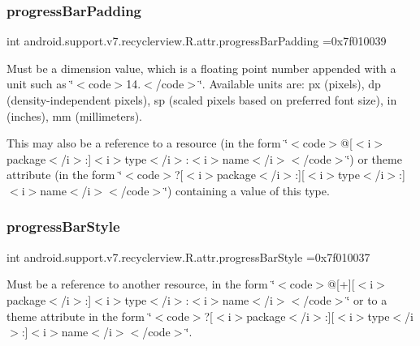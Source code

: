 \subsubsection{\texorpdfstring{progress\+Bar\+Padding}{progressBarPadding}}
{\footnotesize\ttfamily int android.\+support.\+v7.\+recyclerview.\+R.\+attr.\+progress\+Bar\+Padding =0x7f010039\hspace{0.3cm}{\ttfamily [static]}}

Must be a dimension value, which is a floating point number appended with a unit such as \char`\"{}$<$code$>$14.\+5sp$<$/code$>$\char`\"{}. Available units are\+: px (pixels), dp (density-\/independent pixels), sp (scaled pixels based on preferred font size), in (inches), mm (millimeters). 

This may also be a reference to a resource (in the form \char`\"{}$<$code$>$@\mbox{[}$<$i$>$package$<$/i$>$\+:\mbox{]}$<$i$>$type$<$/i$>$\+:$<$i$>$name$<$/i$>$$<$/code$>$\char`\"{}) or theme attribute (in the form \char`\"{}$<$code$>$?\mbox{[}$<$i$>$package$<$/i$>$\+:\mbox{]}\mbox{[}$<$i$>$type$<$/i$>$\+:\mbox{]}$<$i$>$name$<$/i$>$$<$/code$>$\char`\"{}) containing a value of this type. \mbox{\label{classandroid_1_1support_1_1v7_1_1recyclerview_1_1R_1_1attr_af8f4543d9d3f4a921bb071305f4396ca}} 
\subsubsection{\texorpdfstring{progress\+Bar\+Style}{progressBarStyle}}
{\footnotesize\ttfamily int android.\+support.\+v7.\+recyclerview.\+R.\+attr.\+progress\+Bar\+Style =0x7f010037\hspace{0.3cm}{\ttfamily [static]}}

Must be a reference to another resource, in the form \char`\"{}$<$code$>$@\mbox{[}+\mbox{]}\mbox{[}$<$i$>$package$<$/i$>$\+:\mbox{]}$<$i$>$type$<$/i$>$\+:$<$i$>$name$<$/i$>$$<$/code$>$\char`\"{} or to a theme attribute in the form \char`\"{}$<$code$>$?\mbox{[}$<$i$>$package$<$/i$>$\+:\mbox{]}\mbox{[}$<$i$>$type$<$/i$>$\+:\mbox{]}$<$i$>$name$<$/i$>$$<$/code$>$\char`\"{}. \mbox{\label{classandroid_1_1support_1_1v7_1_1recyclerview_1_1R_1_1attr_af3d1dc2803e1890a53351566a66b15da}} 
